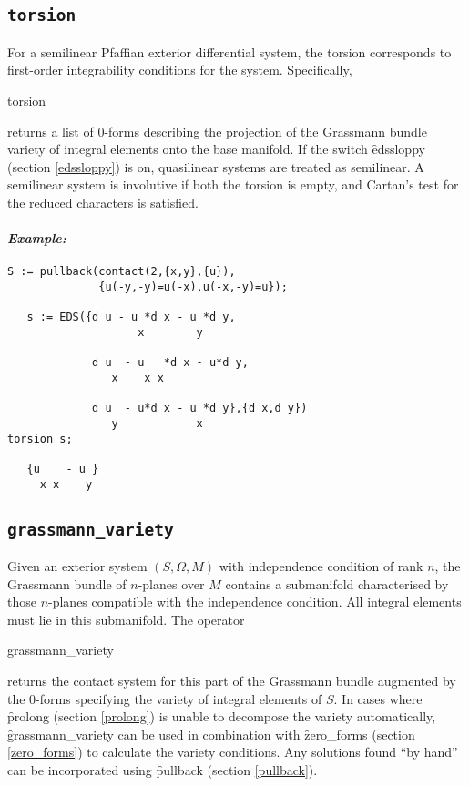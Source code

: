 \subsection{\tt torsion}
\label{torsion}

For a semilinear Pfaffian exterior differential system, the torsion
corresponds to first-order integrability conditions for the
system. Specifically,
\begin{syntax}
	torsion 
\end{syntax}
returns a list of 0-forms describing the projection of the Grassmann bundle
variety of integral elements onto the base manifold. If the switch
\f{edssloppy} (section \ref{edssloppy}) is on, quasilinear systems are
treated as semilinear. A semilinear system is involutive if both the
torsion is empty, and Cartan's test for the reduced characters is
satisfied.

\paragraph{\it Example:}
\begin{verbatim}
S := pullback(contact(2,{x,y},{u}),
              {u(-y,-y)=u(-x),u(-x,-y)=u});

   s := EDS({d u - u *d x - u *d y,
                    x        y 
   
             d u  - u   *d x - u*d y,
                x    x x 
   
             d u  - u*d x - u *d y},{d x,d y})
                y            x 
torsion s;

   {u    - u }
     x x    y 
\end{verbatim}

\subsection{\tt grassmann\_variety}
\label{grassmann_variety}

Given an exterior system $(S,\Omega,M)$ with independence condition of
rank $n$, the Grassmann bundle of $n$-planes over $M$ contains a
submanifold characterised by those $n$-planes compatible with the
independence condition. All integral elements must lie in this
submanifold. The operator
\begin{syntax}
	grassmann\_variety 
\end{syntax}
returns the contact system for this part of the Grassmann bundle augmented
by the 0-forms specifying the variety of integral elements of $S$. In cases
where \f{prolong} (section \ref{prolong}) is unable to decompose the
variety automatically, \f{grassmann\_variety} can be used in combination
with \f{zero\_forms} (section \ref{zero_forms}) to calculate the variety
conditions. Any solutions found ``by hand'' can be incorporated using
\f{pullback} (section \ref{pullback}).

